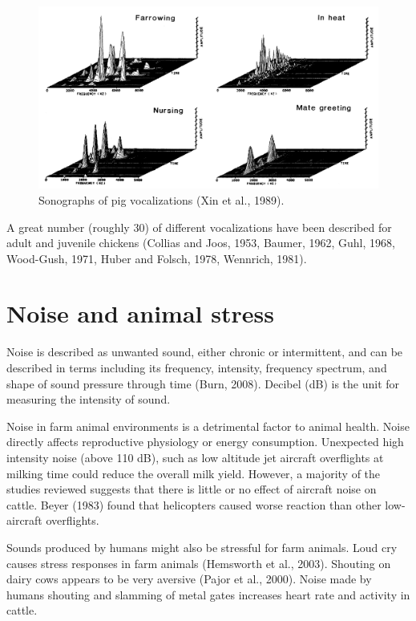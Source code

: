 \documentclass[]{book}
\begin{document}
\begin{figure}

{\centering \includegraphics[width=1\linewidth]{figures/pig-vocal2} 

}

\caption{Sonographs of pig vocalizations (Xin et al., 1989).}\label{fig:pig-vocalization}
\end{figure}

A great number (roughly 30) of different vocalizations have been
described for adult and juvenile chickens (Collias and Joos, 1953,
Baumer, 1962, Guhl, 1968, Wood-Gush, 1971, Huber and Folsch, 1978,
Wennrich, 1981).

\section{Noise and animal stress}\label{noise-and-animal-stress}

Noise is described as unwanted sound, either chronic or intermittent,
and can be described in terms including its frequency, intensity,
frequency spectrum, and shape of sound pressure through time (Burn,
2008). Decibel (dB) is the unit for measuring the intensity of sound.

Noise in farm animal environments is a detrimental factor to animal
health. Noise directly affects reproductive physiology or energy
consumption. Unexpected high intensity noise (above 110 dB), such as low
altitude jet aircraft overflights at milking time could reduce the
overall milk yield. However, a majority of the studies reviewed suggests
that there is little or no effect of aircraft noise on cattle. Beyer
(1983) found that helicopters caused worse reaction than other
low-aircraft overflights.

Sounds produced by humans might also be stressful for farm animals. Loud
cry causes stress responses in farm animals (Hemsworth et al., 2003).
Shouting on dairy cows appears to be very aversive (Pajor et al., 2000).
Noise made by humans shouting and slamming of metal gates increases
heart rate and activity in cattle.
\end{document}
